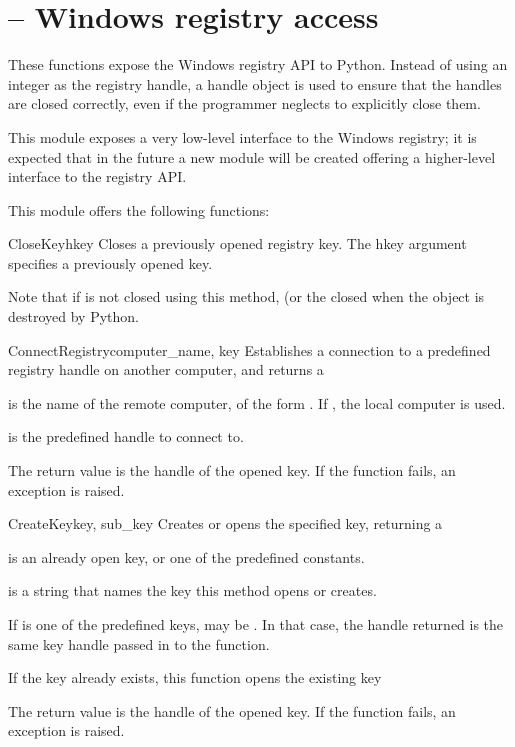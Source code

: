 \section{ --
         Windows registry access}



These functions expose the Windows registry API to Python.  Instead of
using an integer as the registry handle, a handle object is used to
ensure that the handles are closed correctly, even if the programmer
neglects to explicitly close them.

This module exposes a very low-level interface to the Windows
registry; it is expected that in the future a new  
module will be created offering a higher-level interface to the
registry API.

This module offers the following functions:


\begin{funcdesc}{CloseKey}{hkey}
 Closes a previously opened registry key.
 The hkey argument specifies a previously opened key.

 Note that if  is not closed using this method, (or the
  closed when the  object is 
 destroyed by Python.
\end{funcdesc}


\begin{funcdesc}{ConnectRegistry}{computer_name, key}
  Establishes a connection to a predefined registry handle on 
  another computer, and returns a 

  is the name of the remote computer, of the 
 form .  If , the local computer
 is used.
 
  is the predefined handle to connect to.

 The return value is the handle of the opened key.
 If the function fails, an  exception is 
 raised.
\end{funcdesc}


\begin{funcdesc}{CreateKey}{key, sub_key}
 Creates or opens the specified key, returning a 
 
  is an already open key, or one of the predefined 
  constants.
 
  is a string that names the key this method opens 
 or creates.
 
 If  is one of the predefined keys,  may 
 be . In that case, the handle returned is the same key handle 
 passed in to the function.

 If the key already exists, this function opens the existing key

 The return value is the handle of the opened key.
 If the function fails, an  exception is 
 raised.
\end{funcdesc}

